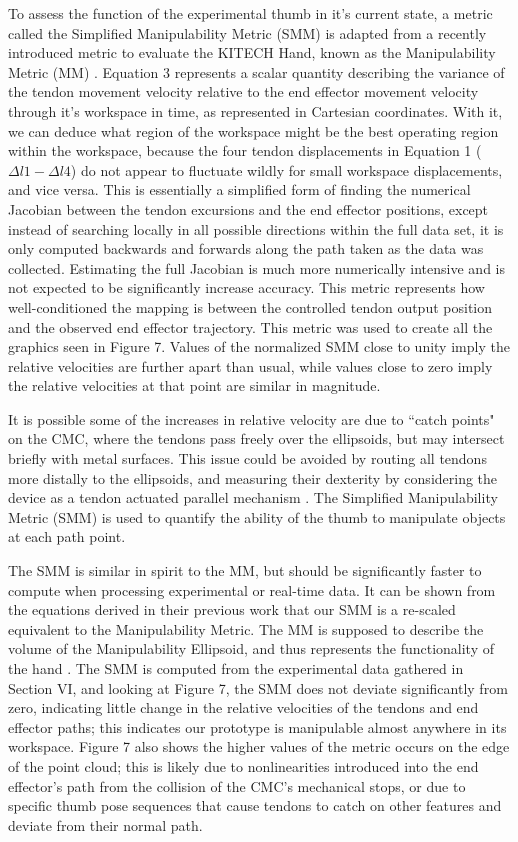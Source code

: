 \documentclass[letterpaper, 10 pt, conference]{ieeeconf}
\begin{document}
To assess the function of the experimental thumb in it's current state, a metric called the Simplified Manipulability Metric (SMM) is adapted from a recently introduced metric to evaluate the KITECH Hand, known as the Manipulability Metric (MM) \cite{kitech}. Equation 3 represents a scalar quantity describing the variance of the tendon movement velocity relative to the end effector movement velocity through it's workspace in time, as represented in Cartesian coordinates. With it, we can deduce what region of the workspace might be the best operating region within the workspace, because the four tendon displacements in Equation 1 ($\Delta l1-\Delta l4$) do not appear to fluctuate wildly for small workspace displacements, and vice versa. This is essentially a simplified form of finding the numerical Jacobian between the tendon excursions and the end effector positions, except instead of searching locally in all possible directions within the full data set, it is only computed backwards and forwards along the path taken as the data was collected. Estimating the full Jacobian is much more numerically intensive and is not expected to be significantly increase accuracy. This metric represents how well-conditioned the mapping is between the controlled tendon output position and the observed end effector trajectory. This metric was used to create all the graphics seen in Figure 7. Values of the normalized SMM close to unity imply the relative velocities are further apart than usual, while values close to zero imply the relative velocities at that point are similar in magnitude.

It is possible some of the increases in relative velocity are due to ``catch points" on the CMC, where the tendons pass freely over the ellipsoids, but may intersect briefly with metal surfaces. This issue could be avoided by routing all tendons more distally to the ellipsoids, and measuring their dexterity by considering the device as a tendon actuated parallel mechanism \cite{dex}. The Simplified Manipulability Metric (SMM) is used to quantify the ability of the thumb to manipulate objects at each path point. 


The SMM is similar in spirit to the MM, but should be significantly faster to compute when processing experimental or real-time data. It can be shown from the equations derived in their previous work that our SMM is a re-scaled equivalent to the Manipulability Metric. The MM is supposed to describe the volume of the Manipulability Ellipsoid, and thus represents the functionality of the hand \cite{kitech}. The SMM is computed from the experimental data gathered in Section VI, and looking at Figure 7, the SMM does not deviate significantly from zero, indicating little change in the relative velocities of the tendons and end effector paths; this indicates our prototype is manipulable almost anywhere in its workspace. Figure 7 also shows the higher values of the metric occurs on the edge of the point cloud; this is likely due to nonlinearities introduced into the end effector's path from the collision of the CMC's mechanical stops, or due to specific thumb pose sequences that cause tendons to catch on other features and deviate from their normal path. 
\end{document}
